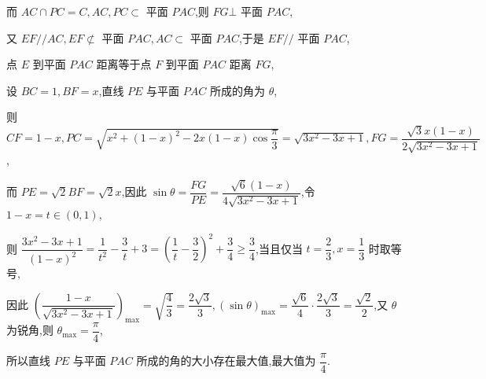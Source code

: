 \begin{enumerate}
\begin{jieda}
\begin{enumerate}
            而 ${AC} \cap  {PC} = C,{AC},{PC} \subset$ 平面 ${PAC}$,则 ${FG} \bot$ 平面 ${PAC}$,

            又 ${EF}//{AC},{EF} \not \subset$ 平面 ${PAC},{AC} \subset$ 平面 ${PAC}$,于是 ${EF}//$ 平面 ${PAC}$,

            点 $E$ 到平面 ${PAC}$ 距离等于点 $F$ 到平面 ${PAC}$ 距离 ${FG}$,

            设 ${BC} = 1,{BF} = x$,直线 ${PE}$ 与平面 ${PAC}$ 所成的角为 $\theta$,

            则 ${CF} = 1 - x,{PC} = \sqrt{{x}^{2} + {\left( 1 - x\right) }^{2} - {2x}\left( {1 - x}\right) \cos \dfrac{\pi }{3}} = \sqrt{3{x}^{2} - {3x} + 1},{FG} = \dfrac{\sqrt{3}x\left( {1 - x}\right) }{2\sqrt{3{x}^{2} - {3x} + 1}}$,

            而 ${PE} = \sqrt{2}{BF} = \sqrt{2}x$,因此 $\sin \theta  = \dfrac{FG}{PE} = \dfrac{\sqrt{6}\left( {1 - x}\right) }{4\sqrt{3{x}^{2} - {3x} + 1}}$,令 $1 - x = t \in  \left( {0,1}\right)$,

            则 $\dfrac{3{x}^{2} - {3x} + 1}{{\left( 1 - x\right) }^{2}} = \dfrac{1}{{t}^{2}} - \dfrac{3}{t} + 3 = {\left( \dfrac{1}{t} - \dfrac{3}{2}\right) }^{2} + \dfrac{3}{4} \geq  \dfrac{3}{4}$,当且仅当 $t = \dfrac{2}{3},x = \dfrac{1}{3}$ 时取等号,

            因此 ${\left( \dfrac{1 - x}{\sqrt{3{x}^{2} - {3x} + 1}}\right) }_{\max } = \sqrt{\dfrac{4}{3}} = \dfrac{2\sqrt{3}}{3},{\left( \sin \theta \right) }_{\max } = \dfrac{\sqrt{6}}{4} \cdot  \dfrac{2\sqrt{3}}{3} = \dfrac{\sqrt{2}}{2}$,又 $\theta$ 为锐角,则 ${\theta }_{\max } = \dfrac{\pi }{4}$,

            所以直线 ${PE}$ 与平面 ${PAC}$ 所成的角的大小存在最大值,最大值为 $\dfrac{\pi }{4}$.
        \end{enumerate}
    \end{jieda}
\end{enumerate}